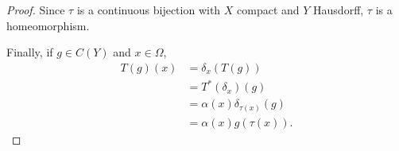 \documentclass[10pt]{mypackage}
\begin{document}
\begin{proof}
  Since $\tau$ is a continuous bijection with $X$ compact and $Y$ Hausdorff, $\tau$ is a homeomorphism.\newline

  Finally, if $g\in C(Y)$ and $x\in\Omega$,
  \begin{align*}
    T\left( g \right)\left( x \right) &= \delta_x\left( T\left( g \right) \right)\\
                                      &= T^{\ast}\left( \delta_x \right)\left( g \right)\\
                                      &= \alpha(x)\delta_{\tau(x)}\left( g \right)\\
                                      &= \alpha(x)g\left( \tau\left( x \right) \right).
  \end{align*}
  
\end{proof}
\end{document}
